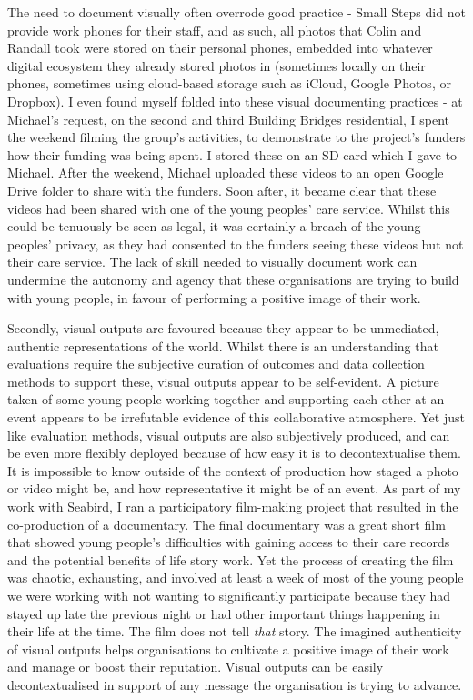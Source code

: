 The need to document visually often overrode good practice - Small Steps did not provide work phones for their staff, and as such, all photos that Colin and Randall took were stored on their personal phones, embedded into whatever digital ecosystem they already stored photos in (sometimes locally on their phones, sometimes using cloud-based storage such as iCloud, Google Photos, or Dropbox). I even found myself folded into these visual documenting practices -  at Michael's request, on the second and third Building Bridges residential, I spent the weekend filming the group's activities, to demonstrate to the project's funders how their funding was being spent. I stored these on an SD card which I gave to Michael. After the weekend, Michael uploaded these videos to an open Google Drive folder to share with the funders. Soon after, it became clear that these videos had been shared with one of the young peoples’ care service. Whilst this could be tenuously be seen as legal, it was certainly a breach of the young peoples’ privacy, as they had consented to the funders seeing these videos but not their care service. The lack of skill needed to visually document work can undermine the autonomy and agency that these organisations are trying to build with young people, in favour of performing a positive image of their work. 

Secondly, visual outputs are favoured because they appear to be unmediated, authentic representations of the world. Whilst there is an understanding that evaluations require the subjective curation of outcomes and data collection methods to support these, visual outputs appear to be self-evident. A picture taken of some young people working together and supporting each other at an event appears to be irrefutable evidence of this collaborative atmosphere. Yet just like evaluation methods, visual outputs are also subjectively produced, and can be even more flexibly deployed because of how easy it is to decontextualise them. It is impossible to know outside of the context of production how staged a photo or video might be, and how representative it might be of an event. As part of my work with Seabird, I ran a participatory film-making project that resulted in the co-production of a documentary. The final documentary was a great short film that showed young people's difficulties with gaining access to their care records and the potential benefits of life story work. Yet the process of creating the film was chaotic, exhausting, and involved at least a week of most of the young people we were working with not wanting to significantly participate because they had stayed up late the previous night or had other important things happening in their life at the time. The film does not tell \emph{that} story. The imagined authenticity of visual outputs helps organisations to cultivate a positive image of their work and manage or boost their reputation. Visual outputs can be easily decontextualised in support of any message the organisation is trying to advance.


